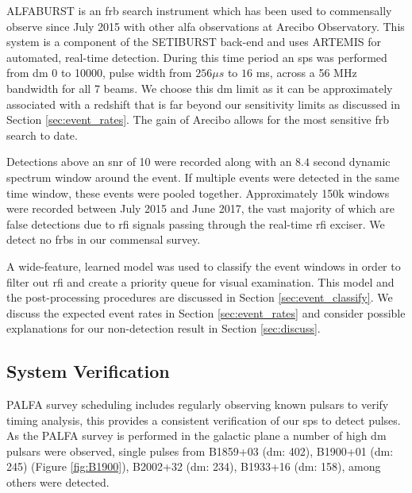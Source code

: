 \documentclass[a4paper,fleqn,usenatbib]{mnras}
\begin{document}
ALFABURST is an \gls{frb} search instrument which has been used to commensally
observe since July 2015 with other \gls{alfa} observations at Arecibo
Observatory. This system is a component of the SETIBURST back-end
\citep{2017ApJS..228...21C} and uses ARTEMIS \citep{2015MNRAS.452.1254K} for
automated, real-time detection. During this time period an \gls{sps} was
performed from \gls{dm} 0 to 10000, pulse width from $256 \mu s$ to $16$ ms,
across a 56 MHz bandwidth for all 7 beams. We choose this \gls{dm} limit as it
can be approximately associated with a redshift that is far beyond our
sensitivity limits as discussed in Section \ref{sec:event_rates}. The gain of
Arecibo allows for the most sensitive \gls{frb} search to date.

Detections above an \gls{snr} of 10 were recorded along with an $8.4$ second
dynamic spectrum window around the event. If multiple events were detected in
the same time window, these events were pooled together.  Approximately 150k
windows were recorded between July 2015 and June 2017, the vast majority of
which are false detections due to \gls{rfi} signals passing through the
real-time \gls{rfi} exciser. We detect no \glspl{frb} in our commensal survey.

A wide-feature, learned model was used to classify the event windows in order to
filter out \gls{rfi} and create a priority queue for visual examination. This
model and the post-processing procedures are discussed in Section
\ref{sec:event_classify}. We discuss the expected event rates in Section
\ref{sec:event_rates} and consider possible explanations for our non-detection
result in Section \ref{sec:discuss}.


\subsection{System Verification}
\label{sec:system_verify}

PALFA survey scheduling includes regularly observing known pulsars to verify
timing analysis, this provides a consistent verification of our \gls*{sps} to
detect pulses. As the PALFA survey is performed in the galactic plane a number
of high \gls*{dm} pulsars were observed, single pulses from B1859+03 (\gls*{dm}:
402), B1900+01 (\gls*{dm}: 245) (Figure \ref{fig:B1900}), B2002+32 (\gls*{dm}:
234), B1933+16 (\gls*{dm}: 158), among others were detected.
\end{document}
